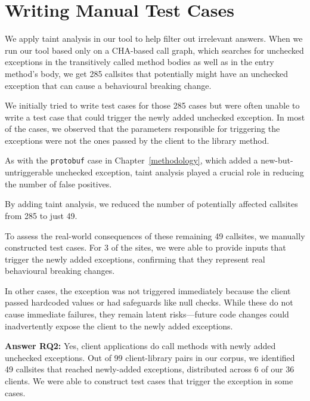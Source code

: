 \section{Writing Manual Test Cases}
We apply taint analysis in our tool to help filter out irrelevant answers. When we run our tool based only on a CHA-based call graph, which
searches for unchecked exceptions in the transitively called method bodies as well as in the entry method's body, we get
285 callsites that potentially might have an unchecked exception that can cause a behavioural breaking change.

We initially tried to write test cases for those 285 cases but were often unable to write a test case that could trigger
the newly added unchecked exception. In most of the cases, we observed that the parameters responsible for triggering the 
exceptions were not the ones passed by the client to the library method.

As with the \texttt{protobuf} case in Chapter~\ref{methodology}, which added a new-but-untriggerable unchecked exception, taint analysis played a crucial role in reducing the number of false positives.

\vspace{1em}
\begin{tcolorbox}[colback=gray!10, colframe=black]
By adding taint analysis, we reduced the number of potentially affected callsites from 285 to just 49.
\end{tcolorbox}
\vspace{1em}

To assess the real-world consequences of these remaining 49 callsites, we manually constructed test cases. For 3 of the sites, we were able to provide inputs that trigger the newly added exceptions, confirming that they represent real behavioural breaking changes.

In other cases, the exception was not triggered immediately because the client passed hardcoded values or had safeguards like null checks. While these do not cause immediate failures, they remain latent risks—future code changes could inadvertently expose the client to the newly added exceptions.

\vspace{1em}
\begin{tcolorbox}[colback=gray!10, colframe=black]
\textbf{Answer RQ2:} Yes, client applications do call methods with newly added unchecked exceptions. Out of 99 client-library pairs in our corpus, we identified 49 callsites that reached newly-added exceptions, distributed across 6 of our 36 clients. We were able to construct test cases that trigger the exception in some cases.
\end{tcolorbox}
\vspace{1em}

